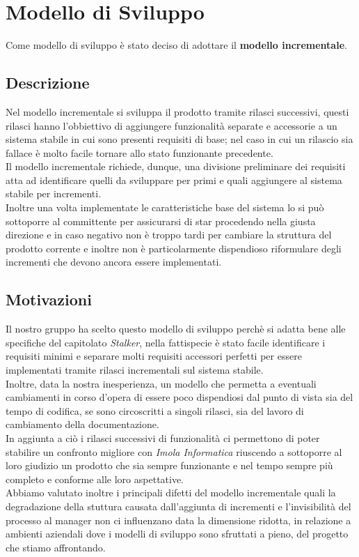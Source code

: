 \section{Modello di Sviluppo}
Come modello di sviluppo è stato deciso di adottare il \textbf{modello incrementale}.
\subsection{Descrizione}
Nel modello incrementale si sviluppa il prodotto tramite rilasci successivi, questi rilasci hanno l'obbiettivo di aggiungere funzionalità separate e accessorie 
a un sistema stabile in cui sono presenti requisiti di base; nel caso in cui un rilascio sia fallace è molto facile tornare allo stato funzionante precedente.\\
Il modello incrementale richiede, dunque, una divisione preliminare dei requisiti atta ad identificare quelli da sviluppare per primi e quali aggiungere al sistema 
stabile per incrementi. \\
Inoltre una volta implementate le caratteristiche base del sistema lo si può sottoporre al committente per assicurarsi di star procedendo nella giusta direzione e in caso negativo
non è troppo tardi per cambiare la struttura del prodotto corrente e inoltre non è particolarmente dispendioso riformulare degli incrementi che devono ancora essere implementati. 

\subsection{Motivazioni}
Il nostro gruppo ha scelto questo modello di sviluppo perchè si adatta bene alle specifiche del capitolato \textit{Stalker},
nella fattispecie  è stato facile identificare i requisiti minimi e separare molti requisiti accessori perfetti per essere implementati
tramite rilasci incrementali sul sistema stabile.\\
Inoltre, data la nostra inesperienza, un modello che permetta a eventuali cambiamenti in corso d'opera di essere poco dispendiosi dal punto di vista
sia del tempo di codifica, se sono circoscritti a singoli rilasci, sia del lavoro di cambiamento della documentazione. \\
In aggiunta a ciò i rilasci successivi di funzionalità ci permettono di poter stabilire un confronto migliore con \textit{Imola Informatica}
riuscendo a sottoporre al loro giudizio un prodotto che sia sempre funzionante e nel tempo sempre più completo e conforme alle loro aspettative. \\
Abbiamo valutato inoltre i principali difetti del modello incrementale quali la degradazione della stuttura causata dall'aggiunta di 
incrementi e l'invisibilità del processo al manager non ci influenzano data la dimensione ridotta, in relazione a 
ambienti aziendali dove i modelli di sviluppo sono sfruttati a pieno, del progetto che stiamo affrontando.
 

